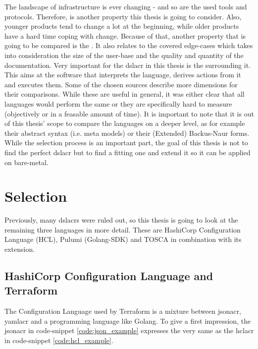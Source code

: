 The landscape of infrastructure is ever changing - and so are the used tools and protocols. Therefore,  is another property this thesis is going to consider.
\newline
Also, younger products tend to change a lot at the beginning, while older products have a hard time coping with change. Because of that, another property that is going to be compared is the . It also relates to the covered edge-cases which takes into consideration the size of the user-base and the quality and quantity of the documentation.
\newline
Very important for the \gls{dslacr} in this thesis is the  surrounding it. This aims at the software that interprets the language, derives actions from it and executes them.
\newline
Some of the chosen sources describe more dimensions for their comparisons. While these are useful in general, it was either clear that all languages would perform the same or they are specifically hard to measure (objectively or in a feasable amount of time). %
\newline
It is important to note that it is out of this thesis' scope to compare the languages on a deeper level, as for example their abstract syntax (i.e. meta models) or their (Extended) Backus-Naur forms. While the selection process is an important part, the goal of this thesis is not to find the perfect \gls{dslacr} but to find a fitting one and extend it so it can be applied on bare-metal.


\section{Selection}
Previously, many \gls{dslacr}s were ruled out, so this thesis is going to look at the remaining three languages in more detail. These are HashiCorp Configuration Language (HCL), Pulumi (Golang-SDK) and TOSCA in combination with its  extension.

\subsection{HashiCorp Configuration Language and Terraform}
The Configuration Language used by Terraform is a mixture between \gls{jsonacr}, \gls{yamlacr} and a programming language like Golang.
To give a first impression, the \gls{jsonacr} in code-snippet \ref{code:json_example} expresses the very same as the \gls{hclacr} in code-snippet \ref{code:hcl_example}.

